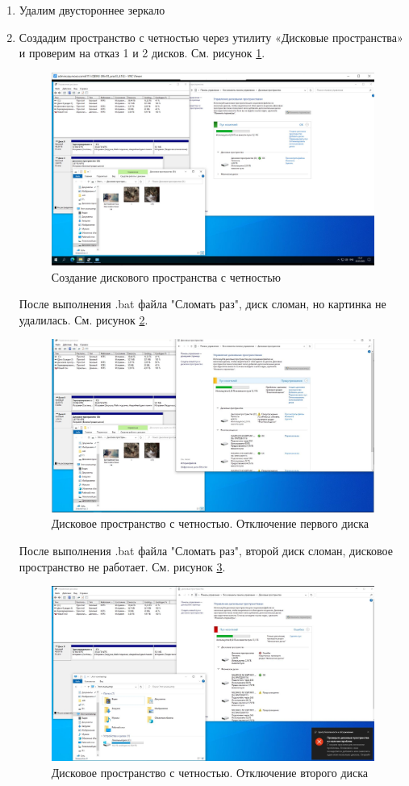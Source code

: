 \documentclass[a4paper,14pt]{extarticle}
\begin{document}
\begin{enumerate}
		
		\item Удалим двустороннее зеркало
		
	\newpage
		\item Создадим пространство с четностью через утилиту «Дисковые пространства» и проверим на отказ 1 и 2 дисков. См. рисунок \ref{fig:15}.

		
		\begin{figure}[h!]
			\centering
			\includegraphics[width=0.7\linewidth]{15}
			\caption{Создание дискового пространства с четностью}
			\label{fig:15}
		\end{figure}

		\newpage
			После выполнения .bat файла "Сломать раз", диск сломан, но картинка не удалилась. См. рисунок \ref{fig:16}.
	\begin{figure}[h!]
		\centering
		\includegraphics[width=0.7\linewidth]{16}
		\caption{Дисковое пространство с четностью. Отключение первого диска}
		\label{fig:16}
	\end{figure}
		
			После выполнения .bat файла "Сломать раз", второй диск сломан, дисковое пространство не работает. См. рисунок \ref{fig:17}.
				\begin{figure}[h!]
				\centering
				\includegraphics[width=0.7\linewidth]{17}
				\caption{Дисковое пространство с четностью. Отключение второго диска}
				\label{fig:17}
			\end{figure}
			
	\end{enumerate}
\end{document}
